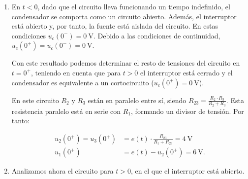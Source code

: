 \documentclass[12pt]{article}
\begin{document}
\begin{enumerate}
\item

  En $t < 0$, dado que el circuito lleva funcionando un tiempo
  indefinido, el condensador se comporta como un circuito
  abierto. Además, el interruptor está abierto y, por tanto, la fuente
  está aislada del circuito. En estas condiciones
  $u_c(0^-) = \qty{0}{\volt}$. Debido a las condiciones de
  continuidad, $u_c(0^+) = u_c(0^-) = \qty{0}{\volt}$.

\begin{minipage}{0.6\linewidth}
  Con este resultado podemos determinar el resto de tensiones del
  circuito en $t = 0^+$, teniendo en cuenta que para $t > 0$ el
  interruptor está cerrado y el condensador es equivalente a un
  cortocircuito ($u_c(0^+) = \qty{0}{\volt}$).
\end{minipage}
\begin{minipage}{0.4\linewidth}
\end{minipage}

En este circuito $R_2$ y $R_3$ están en paralelo entre sí, siendo
$R_{23} = \frac{R_2 \cdot R_3}{R_2 + R_3}$. Esta resistencia paralelo
está en serie con $R_1$, formando un divisor de tensión. Por tanto:

\begin{align*}
  u_2(0^+) = u_3(0^+) &= e(t) \cdot \frac{R_{23}}{R_1 + R_{23}} = \qty{4}{\volt}\\
  u_1(0^+) &= e(t) - u_2(0^+) = \qty{6}{\volt}.
\end{align*}

\item

  Analizamos ahora el circuito para $t > 0$, en el que el interruptor
  está abierto.



\end{enumerate}
\end{document}
